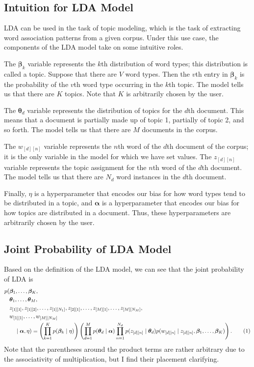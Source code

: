 \documentclass[12pt]{article}
\newcommand\numberthis{\addtocounter{equation}{1}\tag{\theequation}}
\begin{document}
\subsection{Intuition for LDA Model}

LDA can be used in the task of topic modeling, which is the task of extracting
word association patterns from a given corpus.  Under this use case, the
components of the LDA model take on some intuitive roles.

The $\bm{\beta}_{k}$ variable represents the $k$th distribution of word types;
this distribution is called a topic.  Suppose that there are $V$ word types.
Then the $v$th entry in $\bm{\beta}_{k}$ is the probability of the $v$th word
type occurring in the $k$th topic. The model tells us that there are $K$ topics.
Note that $K$ is arbitrarily chosen by the user.

The $\bm{\theta}_{d}$ variable represents the distribution of topics for the
$d$th document.  This means that a document is partially made up of topic 1,
partially of topic 2, and so forth.  The model tells us that there are $M$
documents in the corpus.

The $w_{[d][n]}$ variable represents the $n$th word of the $d$th document of the
corpus; it is the only variable in the model for which we have set values.  The
$z_{[d][n]}$ variable represents the topic assignment for the $n$th word of the
$d$th document.  The model tells us that there are $N_{d}$ word instances in the
$d$th document.

Finally, $\eta$ is a hyperparameter that encodes our bias for how word types
tend to be distributed in a topic, and $\bm{\alpha}$ is a hyperparameter that
encodes our bias for how topics are distributed in a document.  Thus, these
hyperparameters are arbitrarily chosen by the user.

\subsection{Joint Probability of LDA Model}

Based on the definition of the LDA model, we can see that the joint probability
of LDA is
\begin{align*}
    p(&\bm{\beta}_{1}, \ldots, \bm{\beta}_{K},\\
    & \bm{\theta}_{1}, \ldots, \bm{\theta}_{M},\\
    & z_{[1][1]}, z_{[1][2]}, \ldots, z_{[1][N_{1}]}, z_{[2][1]}, \ldots,
    z_{[M][1]}, \ldots, z_{[M][N_{M}]},\\
    & w_{[1][1]}, \ldots, w_{[M][N_{M}]}\\
    &\quad \mid \bm{\alpha}, \eta) =
    \left(\prod_{k=1}^{K}p(\bm{\beta}_{k} \mid \eta)\right)
    \left(\prod_{d=1}^{M}p(\bm{\theta}_{d} \mid \bm{\alpha})
    \prod_{n=1}^{N_{d}}p(z_{[d][n]} \mid \bm{\theta}_{d})
    p(w_{[d][n]} \mid z_{[d][n]}, \bm{\beta}_{1}, \ldots,
    \bm{\beta}_{K})\right).\numberthis\label{eq:jointp}
\end{align*}
Note that the parentheses around the product terms are rather arbitrary due to
the associativity of multiplication, but I find their placement clarifying.
\end{document}
